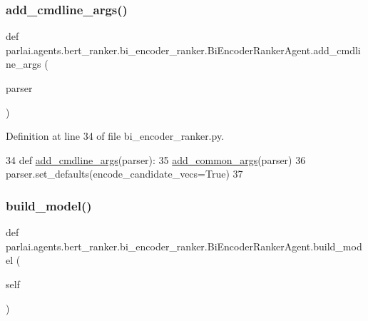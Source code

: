 \subsubsection{\texorpdfstring{add\+\_\+cmdline\+\_\+args()}{add\_cmdline\_args()}}
{\footnotesize\ttfamily def parlai.\+agents.\+bert\+\_\+ranker.\+bi\+\_\+encoder\+\_\+ranker.\+Bi\+Encoder\+Ranker\+Agent.\+add\+\_\+cmdline\+\_\+args (\begin{DoxyParamCaption}\item[{}]{parser }\end{DoxyParamCaption})\hspace{0.3cm}{\ttfamily [static]}}



Definition at line 34 of file bi\+\_\+encoder\+\_\+ranker.\+py.


\begin{DoxyCode}
34     \textcolor{keyword}{def }\hyperlink{namespaceparlai_1_1agents_1_1drqa_1_1config_a62fdd5554f1da6be0cba185271058320}{add\_cmdline\_args}(parser):
35         \hyperlink{namespaceparlai_1_1agents_1_1bert__ranker_1_1helpers_ac2e926c3aba3a62be09e2c37dffcaee2}{add\_common\_args}(parser)
36         parser.set\_defaults(encode\_candidate\_vecs=\textcolor{keyword}{True})
37 
\end{DoxyCode}
\mbox{\label{classparlai_1_1agents_1_1bert__ranker_1_1bi__encoder__ranker_1_1BiEncoderRankerAgent_a120946c26655cbb680f1e492cf4e4817}} 
\subsubsection{\texorpdfstring{build\+\_\+model()}{build\_model()}}
{\footnotesize\ttfamily def parlai.\+agents.\+bert\+\_\+ranker.\+bi\+\_\+encoder\+\_\+ranker.\+Bi\+Encoder\+Ranker\+Agent.\+build\+\_\+model (\begin{DoxyParamCaption}\item[{}]{self }\end{DoxyParamCaption})}




